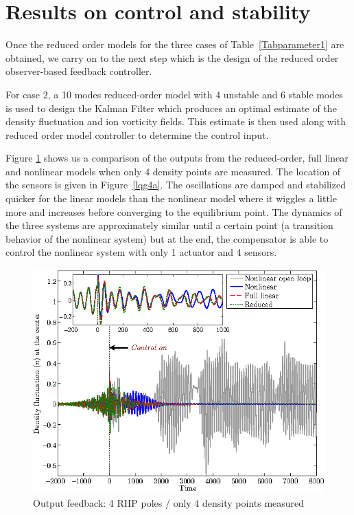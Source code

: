 \documentclass[12pt,lot, lof]{puthesis}
\begin{document}
\section{Results on control and stability}

Once the reduced order models for the three cases of Table~\ref{Tabparameter1} are obtained, we carry on to the next step which is the design of the reduced order observer-based feedback controller.

For case $2$, a 10 modes reduced-order model with 4 unstable and 6 stable modes is used to design the Kalman Filter which produces an optimal estimate of the density fluctuation and ion vorticity fields. This estimate is then used along with reduced order model controller to determine the control input.

Figure \ref{lqg4b} shows us a comparison of the outputs from the reduced-order, full linear and nonlinear models when only 4 density points are measured.
The location of the sensors is given in Figure~\ref{lqg4a}.
The oscillations are damped and stabilized quicker for the linear models than the nonlinear model where it wiggles a little more and increases before converging to the equilibrium point. The dynamics of the three systems are approximately similar until a certain point (a transition behavior of the nonlinear system) but at the end, the compensator is able to control the nonlinear system with only 1 actuator and 4 sensors.

\begin{figure}[htbp]
\centering
\includegraphics[width=0.9\linewidth]{observer3} 
\caption{Output feedback: 4 RHP poles / only 4 density points measured}
\label{lqg4b}
\end{figure}
\end{document}
